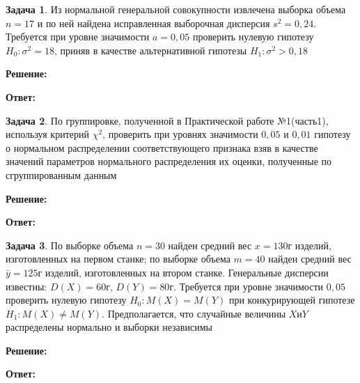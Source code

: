 \documentclass[a4paper,11pt]{article}
\newenvironment{shdd}{\begin{mdframed}[backgroundcolor=shadecolor]}{\end{mdframed}}
\theoremstyle{definition}
\newtheorem{problem}{Задача}\setlength{\parindent}{0pt}
\newenvironment{solution}
{\begin{shdd}
     \textbf{Решение:}\par\setlength{\parindent}{0pt}}
     {
\end{shdd}}
\newenvironment{answer}
{\par\noindent\textbf{Ответ:}}
{\par}
\begin{document}
    \vspace{10pt}
    \begin{problem}
        Из нормальной генеральной совокупности извлечена выборка объема \(n=17\) и по ней
        найдена исправленная выборочная дисперсия \(s^2 = 0,24\).
        Требуется при уровне значимости \(a = 0,05\) проверить нулевую гипотезу \(H_0: \sigma^2 = 18\),
        приняв в качестве альтернативной гипотезы \(H_1: \sigma^2 > 0,18\)

        \begin{solution}
        \end{solution}


        \begin{answer}
        \end{answer}


    \end{problem}



    \vspace{10pt}
    \begin{problem}
        По группировке, полученной в Практической работе №1(часть1), используя критерий \(\chi^2\),
        проверить при уровнях значимости \(0,05\) и \(0,01\) гипотезу о нормальном распределении
        соответствующего признака взяв в качестве значений параметров нормального распределения
        их оценки, полученные по сгруппированным данным

        \begin{solution}
        \end{solution}

        \begin{answer}
        \end{answer}

    \end{problem}



    \vspace{10pt}
    \begin{problem}
        По выборке объема \(n = 30\) найден средний вес \(x = 130\)г изделий, изготовленных на
        первом станке; по выборке объема \(m = 40\) найден средний вес \(\bar{y} = 125\)г изделий,
        изготовленных на втором станке.
        Генеральные дисперсии известны: \(D(X) = 60\)г, \(D(Y) = 80\)г.
        Требуется при уровне значимости \(0,05\) проверить нулевую гипотезу \(H_0 : M(X) = M(Y)\)
        при конкурирующей гипотезе \(H_1 : M(X) \neq M(Y)\).
        Предполагается, что случайные величины \(X\)и\(Y\) распределены нормально и выборки независимы

        \begin{solution}
        \end{solution}

        \begin{answer}
        \end{answer}

    \end{problem}
\end{document}
